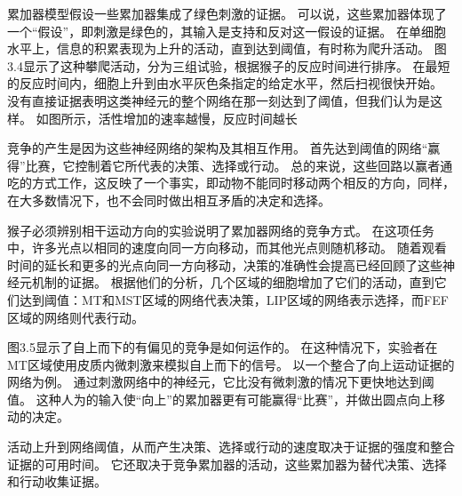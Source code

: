累加器模型假设一些累加器集成了绿色刺激的证据。
可以说，这些累加器体现了一个“假设”，即刺激是绿色的，其输入是支持和反对这一假设的证据。
在单细胞水平上，信息的积累表现为上升的活动，直到达到阈值，有时称为爬升活动。
图3.4显示了这种攀爬活动，分为三组试验，根据猴子的反应时间进行排序。
在最短的反应时间内，细胞上升到由水平灰色条指定的给定水平，然后扫视很快开始。
没有直接证据表明这类神经元的整个网络在那一刻达到了阈值，但我们认为是这样。
如图所示，活性增加的速率越慢，反应时间越长\par


竞争的产生是因为这些神经网络的架构及其相互作用。
首先达到阈值的网络“赢得”比赛，它控制着它所代表的决策、选择或行动。
总的来说，这些回路以赢者通吃的方式工作，这反映了一个事实，即动物不能同时移动两个相反的方向，同样，在大多数情况下，也不会同时做出相互矛盾的决定和选择。\par


猴子必须辨别相干运动方向的实验说明了累加器网络的竞争方式。
在这项任务中，许多光点以相同的速度向同一方向移动，而其他光点则随机移动。
随着观看时间的延长和更多的光点向同一方向移动，决策的准确性会提高\cite{Gold&Shadlen 2007}已经回顾了这些神经元机制的证据。
根据他们的分析，几个区域的细胞增加了它们的活动，直到它们达到阈值：MT和MST区域的网络代表决策，LIP区域的网络表示选择，而FEF区域的网络则代表行动\cite{Kim&Shadlen,1999}。\par


图3.5显示了自上而下的有偏见的竞争是如何运作的。
在这种情况下，实验者在MT区域使用皮质内微刺激来模拟自上而下的信号。
以一个整合了向上运动证据的网络为例。
通过刺激网络中的神经元，它比没有微刺激的情况下更快地达到阈值。
这种人为的输入使“向上”的累加器更有可能赢得“比赛”，并做出圆点向上移动的决定。\par


活动上升到网络阈值，从而产生决策、选择或行动的速度取决于证据的强度和整合证据的可用时间。
它还取决于竞争累加器的活动，这些累加器为替代决策、选择和行动收集证据。\par


